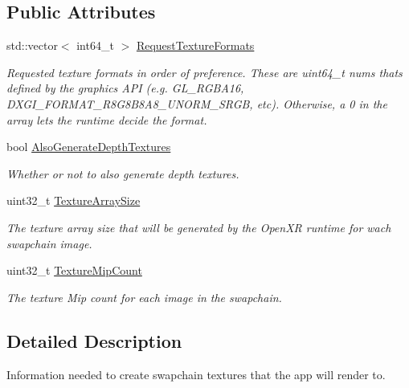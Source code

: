 \subsection*{Public Attributes}
\begin{DoxyCompactItemize}
\item 
std\+::vector$<$ int64\+\_\+t $>$ \mbox{\hyperlink{struct_open_x_r_provider_1_1_x_r_render_info_a84860b74dcb11fbc7494883b555f3029}{Request\+Texture\+Formats}}
\begin{DoxyCompactList}\small\item\em Requested texture formats in order of preference. These are uint64\+\_\+t nums that\textquotesingle{}s defined by the graphics A\+PI (e.\+g. G\+L\+\_\+\+R\+G\+B\+A16, D\+X\+G\+I\+\_\+\+F\+O\+R\+M\+A\+T\+\_\+\+R8\+G8\+B8\+A8\+\_\+\+U\+N\+O\+R\+M\+\_\+\+S\+R\+GB, etc). Otherwise, a 0 in the array lets the runtime decide the format. \end{DoxyCompactList}\item 
bool \mbox{\hyperlink{struct_open_x_r_provider_1_1_x_r_render_info_a077981773d615095540c4750e8c08bf4}{Also\+Generate\+Depth\+Textures}}
\begin{DoxyCompactList}\small\item\em Whether or not to also generate depth textures. \end{DoxyCompactList}\item 
uint32\+\_\+t \mbox{\hyperlink{struct_open_x_r_provider_1_1_x_r_render_info_a9bf5bd224350b3fcc79a1643b8cc85f6}{Texture\+Array\+Size}}
\begin{DoxyCompactList}\small\item\em The texture array size that will be generated by the Open\+XR runtime for wach swapchain image. \end{DoxyCompactList}\item 
uint32\+\_\+t \mbox{\hyperlink{struct_open_x_r_provider_1_1_x_r_render_info_ad86a33b90d0f38aa11a3cd4e0dc521b4}{Texture\+Mip\+Count}}
\begin{DoxyCompactList}\small\item\em The texture Mip count for each image in the swapchain. \end{DoxyCompactList}\end{DoxyCompactItemize}


\subsection{Detailed Description}
Information needed to create swapchain textures that the app will render to. 

